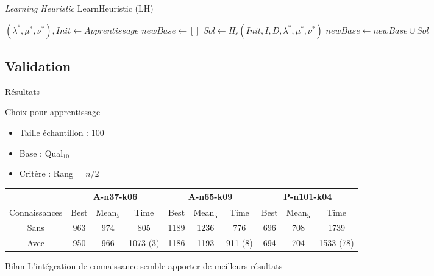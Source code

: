 \documentclass{beamer}
\begin{document}
\begin{frame}{\emph{Learning Heuristic}}
LearnHeuristic (LH)

\begin{algorithm}[H]
\DontPrintSemicolon %
$(\lambda^*,\mu^*,\nu^*), Init \gets Apprentissage$\;
$newBase \gets []$\;
 {
	 {
		$Sol \gets H_c(Init,I,D,\lambda^*,\mu^*,\nu^*)$\;
		$newBase \gets newBase \cup Sol$\;
	}
}
\;
\end{algorithm}
\end{frame}

\subsection{Validation}
\begin{frame}{Résultats}

\begin{block}{Choix pour apprentissage}
\begin{itemize}
\item Taille échantillon : 100
\item Base : Qual$_{10}$
\item Critère : Rang = $n/2$
\end{itemize}

\end{block}
\begin{table}[H]

\begin{tabular}{|@{}c@{}|@{}c@{}|@{}c@{}|@{}c@{}|@{}c@{}|@{}c@{}|@{}c@{}|@{}c@{}|@{}c@{}|@{}c@{}|}
   \hline
    & \multicolumn{3}{c|}{A-n37-k06} & \multicolumn{3}{c|}{A-n65-k09} & \multicolumn{3}{c|}{P-n101-k04} \\
   \hline
   Connaissances & Best & Mean$_5$ & Time & Best & Mean$_5$ & Time & Best & Mean$_5$ & Time \\
   \hline
   Sans &  963 & 974 & 805 & 1189 & 1236 & 776 & 696 & 708 & 1739  \\   
   \hline
   Avec & 950 & 966 & 1073 (3) & 1186 & 1193 & 911 (8) & 694 & 704 & 1533 (78) \\
   \hline
\end{tabular}
\end{table}
\begin{exampleblock}{Bilan}
L'intégration de connaissance semble apporter de meilleurs résultats
\end{exampleblock}
\end{frame}
\end{document}
